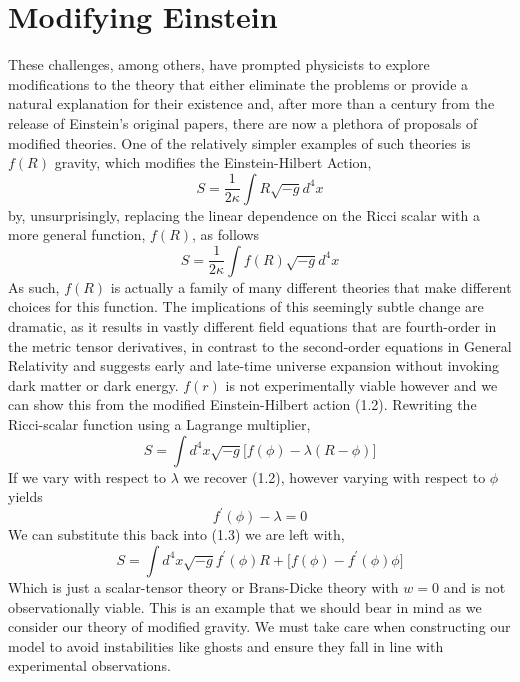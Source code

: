 \documentclass[11pt]{report}
\numberwithin{equation}{chapter}
\begin{document}
\section{Modifying Einstein}
 These challenges, among others, have prompted physicists to explore modifications to the theory that either eliminate the problems or provide a natural explanation for their existence and, after more than a century from the release of Einstein's original papers, there are now a plethora of proposals of modified theories. One of the relatively simpler examples of such theories is $f(R)$ gravity, which modifies the Einstein-Hilbert Action\cite{fr_review}, 
 \begin{equation}
     S = \frac{1}{2\kappa}\int  R \sqrt{-g}d^4 x
 \end{equation}
 by, unsurprisingly, replacing the linear dependence on the Ricci scalar with a more general function, $f(R)$, as follows
 \begin{equation}
     S = \frac{1}{2\kappa}\int  f(R) \sqrt{-g}d^4 x
 \end{equation}
 As such, $f(R)$ is actually a family of many different theories that make different choices for this function. The implications of this seemingly subtle change are dramatic, as it results in vastly different field equations that are fourth-order in the metric tensor derivatives, in contrast to the second-order equations in General Relativity and suggests early and late-time universe expansion without invoking dark matter or dark energy. $f(r)$ is not experimentally viable however and we can show this from the modified Einstein-Hilbert action (1.2). Rewriting the Ricci-scalar function using a Lagrange multiplier,
 \begin{equation}
     S = \int d^4x \sqrt{-g}\big[f\left(\phi\right)-\lambda\left(R-\phi\right)\big]
 \end{equation}
 If we vary with respect to $\lambda$ we recover (1.2), however varying with respect to $\phi$ yields
 \begin{equation}
     f^{\prime}\left(\phi\right)-\lambda=0
 \end{equation}
 We can substitute this back into (1.3) we are left with,
 \begin{equation}
     S=\int d^4x \sqrt{-g} f^{\prime}\left(\phi\right)R
     +\big[f\left(\phi\right)-f^{\prime}\left(\phi\right)\phi]
 \end{equation}
 Which is just a scalar-tensor theory or Brans-Dicke theory with $w=0$ and is not observationally viable\cite{bransdicke}. This is an example that we should bear in mind as we consider our theory of modified gravity. We must take care when constructing our model to avoid instabilities like ghosts and ensure they fall in line with experimental observations. 
 
\end{document}
